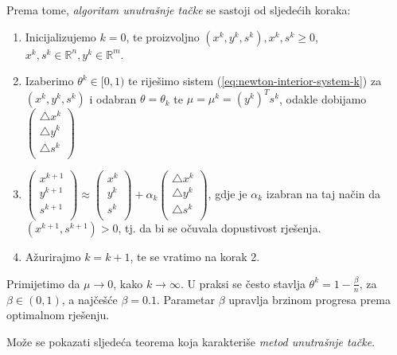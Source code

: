 \documentclass[a4paper, utf8, 11pt, colorlinks]{book}
\begin{document}
Prema tome, \emph{algoritam unutrašnje tačke} se sastoji od sljedećih koraka:
\begin{enumerate}
	\item Inicijalizujemo $k=0$, te proizvoljno  $(x^k, y^k, s^k), x^k, s^k \geq 0$, $x^k,s^k \in \mathbb{R}^n, y^k \in \mathbb{R}^m$.
	\item Izaberimo $ \theta^k \in [0, 1)$ te riješimo sistem (\ref{eq:newton-interior-system-k}) za $(x^k,y^k,s^k)$ i odabran $\theta = \theta_k$ te $\mu = \mu^k = (y^k)^T s^k $,  odakle   dobijamo
	$  
	\begin{pmatrix}
		\bigtriangleup x^k      \\
		\bigtriangleup y^k       \\
		\bigtriangleup s^k       \\
	\end{pmatrix}    
	$
	
	\item $ 
	\begin{pmatrix}
		x^{k+1}  \\
		y^{k+1}   \\
		s^{k+1}   \\
	\end{pmatrix} \approx
	\begin{pmatrix}
		x^k  \\
		y^k  \\
		s^k  \\
	\end{pmatrix} +   
	\alpha_k 
	\begin{pmatrix}
		\bigtriangleup x^k       \\
		\bigtriangleup y^k       \\
		\bigtriangleup s^k       \\
	\end{pmatrix}  
	$, gdje je $\alpha_k$ izabran na taj način da $(x^{k+1}, s^{k+1}) > 0$, tj. da bi se očuvala dopustivost rješenja. 
	\item Ažurirajmo $k = k + 1$, te se vratimo na korak 2.
\end{enumerate}
Primijetimo da $\mu \rightarrow 0$, kako $k \rightarrow \infty$. U praksi se često stavlja $\theta^k = 1 - \frac{\beta}{n}$, za $\beta \in (0,1)$, a najčešće $\beta= 0.1$.  Parametar $\beta$ upravlja brzinom progresa prema optimalnom rješenju.  


Može se pokazati sljedeća teorema koja karakteriše \emph{metod unutrašnje tačke}.
\end{document}
